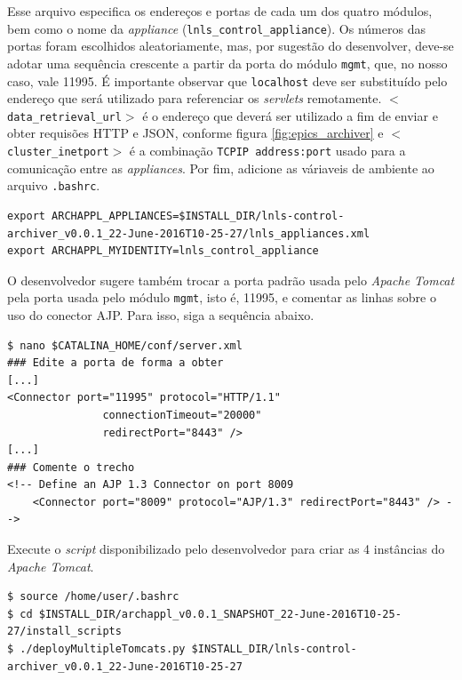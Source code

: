 \begin {enumerate}[i.]
Esse arquivo especifica os endereços e portas de cada um dos quatro módulos, bem
como o nome da \textit{appliance} (\texttt{lnls\_control\_appliance}). Os
números das portas foram escolhidos aleatoriamente, mas, por sugestão do desenvolver,
deve-se adotar uma sequência crescente a partir da porta do módulo
\texttt{mgmt}, que, no nosso caso, vale 11995. É importante observar que
\texttt{localhost} deve ser substituído pelo endereço que será utilizado para
referenciar os \textit{servlets} remotamente.
\texttt{\(<\)data\_retrieval\_url\(>\)} é o endereço que deverá ser utilizado a
fim de enviar e obter requisões HTTP e JSON, conforme figura
\ref{fig:epics_archiver} e \texttt{\(<\)cluster\_inetport\(>\)} é a combinação
\texttt{TCPIP address:port} usado para a comunicação entre as
\textit{appliances}. Por fim, adicione as váriaveis de ambiente ao arquivo
\texttt{.bashrc}.

\begin{lstlisting}[keywordstyle=\ttfamily, style=nonumbers]
export ARCHAPPL_APPLIANCES=$INSTALL_DIR/lnls-control-archiver_v0.0.1_22-June-2016T10-25-27/lnls_appliances.xml
export ARCHAPPL_MYIDENTITY=lnls_control_appliance
\end{lstlisting}

O desenvolvedor sugere também trocar a porta padrão usada pelo \textit{Apache
Tomcat} pela porta usada pelo módulo \texttt{mgmt}, isto é, 11995, e comentar
as linhas sobre o uso do conector AJP. Para isso, siga a sequência abaixo.

\begin{lstlisting}[keywordstyle=\ttfamily, style=nonumbers]
$ nano $CATALINA_HOME/conf/server.xml
### Edite a porta de forma a obter
[...]
<Connector port="11995" protocol="HTTP/1.1"
               connectionTimeout="20000"
               redirectPort="8443" />
[...]
### Comente o trecho
<!-- Define an AJP 1.3 Connector on port 8009 
    <Connector port="8009" protocol="AJP/1.3" redirectPort="8443" /> -->
\end{lstlisting}

Execute o \textit{script} disponibilizado pelo desenvolvedor para criar as 4
instâncias do \textit{Apache Tomcat}.

\begin{lstlisting}[keywordstyle=\ttfamily, style=nonumbers]
$ source /home/user/.bashrc
$ cd $INSTALL_DIR/archappl_v0.0.1_SNAPSHOT_22-June-2016T10-25-27/install_scripts
$ ./deployMultipleTomcats.py $INSTALL_DIR/lnls-control-archiver_v0.0.1_22-June-2016T10-25-27
\end{lstlisting}


\end{enumerate}
